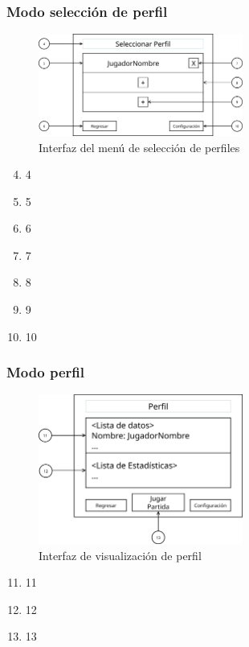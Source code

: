 \subsubsection{Modo selección de perfil}
\begin{figure}[H]
    \centering
    \includegraphics[width=0.6\textwidth]{5-Cuerpo/Chapter5/I2.png} %
    \caption{Interfaz del menú de selección de perfiles}
    \label{fig:Interface_Seleccion_Perfil}
\end{figure}
\begin{enumerate}\setcounter{enumi}{3}
    \item 4
    \item 5
    \item 6
    \item 7
    \item 8
    \item 9
    \item 10
\end{enumerate}

\subsubsection{Modo perfil}
\begin{figure}[H]
    \centering
    \includegraphics[width=0.6\textwidth]{5-Cuerpo/Chapter5/I3.png} %
    \caption{Interfaz de visualización de perfil}
    \label{fig:Interface_Perfil}
\end{figure}
\begin{enumerate}\setcounter{enumi}{10}
    \item 11
    \item 12
    \item 13
\end{enumerate}

